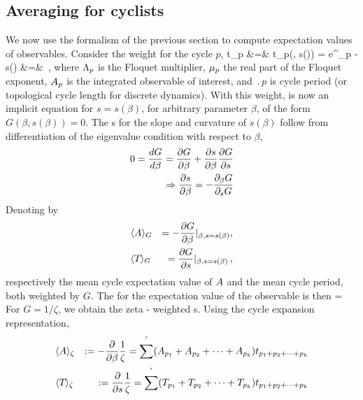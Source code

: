 \documentclass[aps,pre,
                showpacs,
                twocolumn,
                groupedaddress,
                superscriptaddress,
                floatfix]{revtex4-1}
\begin{document}
\subsection{Averaging for cyclists}
\label{sect:AverCycl}

We now use the formalism of the previous section to compute expectation values of
observables. Consider the weight for the cycle $p$,
\bea
t_{p} &=& t_{p}(\beta, s(\beta))
       =  e^{\beta \Obser_{p} - s(\beta)}
\continue
       &=& \exp{}
\,,
\label{cyclWeight}
\eea
where $\Lambda_{p}$ is the Floquet multiplier, $\eigRe_{p}$ the real
part of the Floquet exponent, $A_{p}$ is the integrated observable
of interest, and $\period{p}$ is cycle period (or topological cycle
length for discrete dynamics). With this weight,  is now
an implicit equation for $s=s(\beta)$, for arbitrary parameter $\beta$,
of the form $G(\beta, s(\beta)) = 0$. The {\cycForm s} for the slope and
curvature of $s(\beta)$ follow from differentiation of the eigenvalue
condition with respect to $\beta$,
\begin{eqnarray*}
0 = \frac{d G}{d\beta}
= \frac{\partial G}{\partial \beta} + \frac{\partial s}{\partial \beta}\frac{\partial G}{\partial s}
\\
\Rightarrow \frac{\partial s}{\partial \beta} = -\frac{\partial_{\beta}G}{\partial_{s} G}
\end{eqnarray*}
Denoting by
\begin{eqnarray*}
&\langle {\ensuremath{A}} \rangle_{G}& = -\frac{\partial G}{\partial \beta}|_{\beta, s=s(\beta)}
,\\ &\langle {{\ensuremath{T_{}}}} \rangle_{G}& = \frac{\partial G}{\partial s}\vert_{\beta, s=s(\beta)}
\,,
\end{eqnarray*}
respectively the mean cycle expectation value of $A$ and the mean cycle
period, both weighted by $G$. The {\cycForm} for the
expectation value of the observable is then
\beq
\expct{\obser} = 
For $G = 1/\zeta$, we obtain the zeta - weighted {\cycForm s}. Using
the cycle expansion representation,
\begin{eqnarray*}
&\expct{\Obser}_{\zeta}
  &:=-\frac{\pde}{\pde \beta}\frac{1}{\zeta}
  =\sum^{'}(\Obser_{p_{1}}+\Obser_{p_{2}}+\cdots+\Obser_{p_{k}})t_{p_{1}+p_{2}+\cdots+p_{k}} \\
&\expct{\period{}}_{\zeta}&:=\frac{\pde}{\pde s}\frac{1}{\zeta}=\sum^{'}(T_{p_{1}}+T_{p_{2}}+\cdots+T_{p_{k}})t_{p_{1}+p_{2}+\cdots+p_{k}}
\end{eqnarray*}
\end{document}

